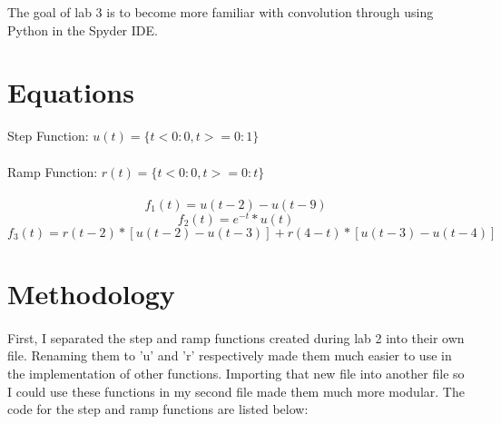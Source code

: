\documentclass[12pt]{report}
\begin{document}
The goal of lab 3 is to become more familiar with convolution through using Python in the Spyder IDE.

\section{Equations}
 Step Function: $u(t) = \{t<0:0, t>=0:1\}$ \\ \\
 Ramp Function: $r(t) = \{t<0:0, t>=0:t\}$ \\ \\
    \begin{equation*}
        f_1(t) = u(t-2) - u(t-9) 
    \end{equation*}
    \begin{equation*}
        f_2(t) = e^{-t} * u(t) %
    \end{equation*}
    \begin{equation*}
        f_3(t) = r(t − 2) * [u(t − 2) − u(t − 3)] + r(4 − t) * [u(t − 3) − u(t − 4)]
    \end{equation*}

\section{Methodology}


    \paragraph{} First, I separated the step and ramp functions created during lab 2 into their own file. Renaming them to 'u' and 'r' respectively made them much easier to use in the implementation of other functions. Importing that new file into another file so I could use these functions in my second file made them much more modular. The code for the step and ramp functions are listed below:
\end{document}
